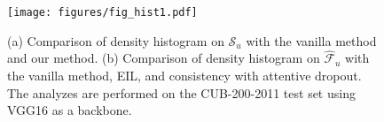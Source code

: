 \begin{figure}[t]
	\centering
    \texttt{[image: figures/fig\_hist1.pdf]}
    \vspace{-0.7em}
    \caption{(a) Comparison of density histogram on $\mathcal{S}_u$ with the vanilla method and our method. (b) Comparison of density histogram on $\hat{\mathcal{F}}_u$ with the vanilla method, EIL, and consistency with attentive dropout. The analyzes are performed on the CUB-200-2011 test set using VGG16 as a backbone.}
    \label{fig:hist}
\end{figure}